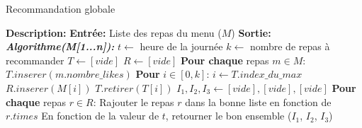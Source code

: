 \documentclass[11pt]{article}
\begin{document}
\begin{algorithm}
    \caption{Recommandation globale}
    \begin{algorithmic}[1]
        \Statex \textbf{Description:}
        \Statex \textbf{Entrée:} Liste des repas du menu ($M$)
        \Statex \textbf{Sortie:}
        \State \textbf{\textit{Algorithme(M[1...n]):}}
        \State \hspace{0.5cm} $t \leftarrow$ heure de la journée
        \State \hspace{0.5cm} $k \leftarrow$ nombre de repas à recommander
        \State \hspace{0.5cm} $T \leftarrow [vide]$
        \State \hspace{0.5cm} $R \leftarrow [vide]$
        \State \hspace{0.5cm} \textbf{Pour chaque} repas $m \in M$:
        \State \hspace{1cm} $T.inserer(m.nombre\_likes)$
        \State \hspace{0.5cm} \textbf{Pour} $i \in [0, k]$:
        \State \hspace{1cm} $i \leftarrow T.index\_du\_max$
        \State \hspace{1cm} $R.inserer(M[i])$
        \State \hspace{1cm} $T.retirer(T[i])$
        \State \hspace{0.5cm} $I_1, I_2, I_3 \leftarrow [vide], [vide], [vide]$
        \State \hspace{0.5cm} \textbf{Pour chaque} repas $r \in R$:
        \State \hspace{1cm} Rajouter le repas $r$ dans la bonne liste en fonction de $r.times$
        \State \hspace{0.5cm} En fonction de la valeur de $t$, retourner le bon ensemble ($I_1$, $I_2$, $I_3$)
    \end{algorithmic}
\end{algorithm}
\end{document}
